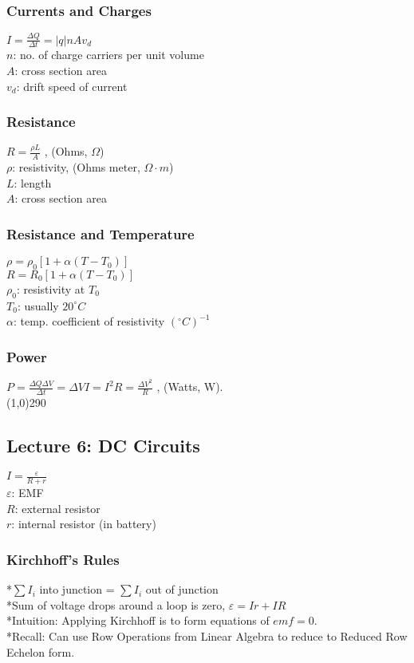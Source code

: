 \documentclass[10 pt]{article}
\begin{document}
\begin{multicols}{2}
\subsubsection*{Currents and Charges}
$I = \frac{\Delta Q}{\Delta t} = |q|nAv_{d}$ \\
\normalsize
$n$: no. of charge carriers per unit volume \\
$A$: cross section area \\
$v_{d}$: drift speed of current

\subsubsection*{Resistance}
$R = \frac{\rho L}{A}$ , (Ohms, $\Omega$) \\
$\rho$: resistivity, (Ohms meter, $\Omega \cdot m$) \\
$L$: length \\
$A$: cross section area

\subsubsection*{Resistance and Temperature}
$\rho = \rho_{0} [ 1 + \alpha (T - T_{0}) ]$ \\
$R = R_{0} [ 1 + \alpha (T - T_{0}) ]$ \\
\normalsize
$\rho_{0}$: resistivity at $T_{0}$ \\
$T_{0}$: usually $20^{\circ} C$ \\
$\alpha$: temp. coefficient of resistivity $(^{\circ}C)^{-1}$

\subsubsection*{Power}
$P = \frac{\Delta Q \Delta V}{\Delta t} = \Delta V I = I^{2} R = \frac{\Delta V^{2}}{R}$ , (Watts, W).
\\
\line(1,0){290}
\subsection*{Lecture 6: DC Circuits}
$I = \frac{\varepsilon}{R + r}$ \\
\normalsize
$\varepsilon$: EMF \\
$R$: external resistor \\
$r$: internal resistor (in battery)

\subsubsection*{Kirchhoff's Rules}
*$\sum I_{i}$ into junction = $\sum I_{i}$ out of junction \\
*Sum of voltage drops around a loop is zero, $\varepsilon = Ir + IR$ \\
*Intuition: Applying Kirchhoff is to form equations of $emf = 0$. \\
*Recall: Can use Row Operations from Linear Algebra to reduce to Reduced Row Echelon form.


\end{multicols}
\end{document}
